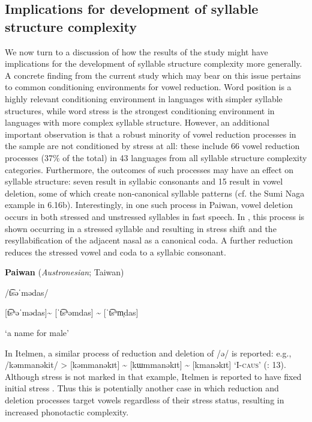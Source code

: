 \subsection{Implications for development of syllable structure complexity}\label{sec:6.4.2}

  We now turn to a discussion of how the results of the study might have implications for the development of syllable structure complexity more generally. A concrete finding from the current study which may bear on this issue pertains to common conditioning environments for vowel reduction. Word position is a highly relevant conditioning environment in languages with simpler syllable structures, while word stress is the strongest conditioning environment in languages with more complex syllable structure. However, an additional important observation is that a robust minority of vowel reduction processes in the sample are not conditioned by stress at all: these include 66 vowel reduction processes (37\% of the total) in 43 languages from all syllable structure complexity categories. Furthermore, the outcomes of such processes may have an effect on syllable structure: seven result in syllabic consonants and 15 result in vowel deletion, some of which create non-canonical syllable patterns (cf. the Sumi Naga example in 6.16b). Interestingly, in one such process in Paiwan, vowel deletion occurs in both stressed and unstressed syllables in fast speech. In , this process is shown occurring in a stressed syllable and resulting in stress shift and the resyllabification of the adjacent nasal as a canonical coda. A further reduction reduces the stressed vowel and coda to a syllabic consonant.

\ea\label{ex:(6.21)}
  \textbf{Paiwan} (\textit{Austronesian}; Taiwan)

/t͡səˈmədas/

[t͡sʰəˈmədas]{\textasciitilde} [ˈt͡sʰəmdas] {\textasciitilde} [ˈt͡sʰm̩das]

\glt ‘a name for male’

\citep[42]{Chang2006}
\z

In Itelmen, a similar process of reduction and deletion of /ə/ is reported: e.g., /kəmmanəkit/ > [kəmmanəkɪt] {\textasciitilde} [kɯmmanəkɪt] {\textasciitilde} [kmanəkɪt] ‘I-\textsc{caus}’ (\citealt{GeorgVolodin1999}: 13). Although stress is not marked in that example, Itelmen is reported to have fixed initial stress \citep[6]{Bobaljik2006}. Thus this is potentially another case in which reduction and deletion processes target vowels regardless of their stress status, resulting in increased phonotactic complexity. 

